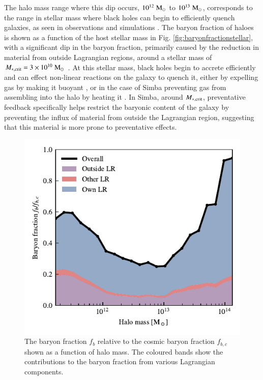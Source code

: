 \documentclass[fleqn,usenatbib]{mnras}
\newcommand{\msolar}{\;{\rm M}_{\odot}}
\newcommand{\simba}{{\sc Simba}}
\begin{document}
The halo mass range where this dip occurs, $10^{12}\msolar{}$ to
$10^{13}\msolar{}$, corresponds to the range in stellar mass
\citep[$10^{10}\msolar{}$ to $10^{11}\msolar{}$,][]{Moster2013} where black
holes can begin to efficiently quench galaxies, as seen in observations
\citep{Kauffmann2003} and simulations \citep{Bower2017, Taylor2017}. The
baryon fraction of haloes is shown as a function of the host stellar mass in
Fig. \ref{fig:baryonfractionstellar}, with a significant dip in the baryon
fraction, primarily caused by the reduction in material from outside
Lagrangian regions, around a stellar mass of $M_{*, {\rm crit}} =
3\times10^{10} \msolar{}$ \citep{Kauffmann2003}. At this stellar mass, black
holes begin to accrete efficiently \citep{AnglesAlcazar2017c} and can effect
non-linear reactions on the galaxy to quench it, either by expelling gas by
making it buoyant \citep{Bower2017}, or in the case of \simba{} preventing
gas from assembling into the halo by heating it \citep{Dave2019}. In
\simba{}, around $M_{*, {\rm crit}}$, preventative feedback specifically
helps restrict the baryonic content of the galaxy by preventing the influx of
material from outside the Lagrangian region, suggesting that this material is
more prone to preventative effects.


\begin{figure}
	\centering
	\includegraphics{figures/s50j7kAHF/baryon_fraction_breakdown.pdf}
	\vspace{-0.7cm}
	\caption{The baryon fraction $f_b$ relative to the cosmic baryon fraction
	$f_{b, c}$ shown as a function of halo mass. The coloured bands show the
	contributions to the baryon fraction from various Lagrangian components.}
	\label{fig:baryonfraction}
\end{figure}
\end{document}
